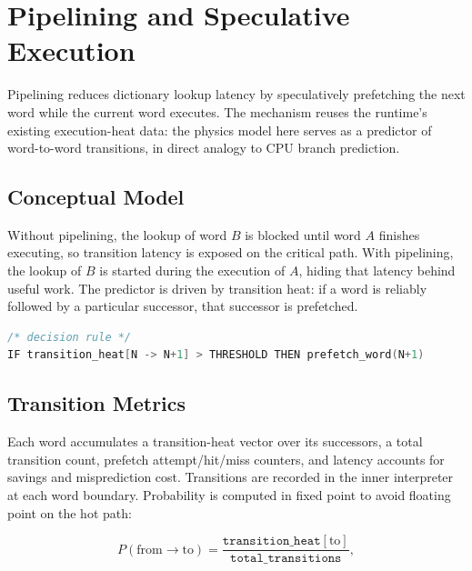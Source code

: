 
\section{Pipelining and Speculative Execution}

Pipelining reduces dictionary lookup latency by speculatively prefetching the
next word while the current word executes. The mechanism reuses the runtime's
existing execution-heat data: the physics model here serves as a predictor of
word-to-word transitions, in direct analogy to CPU branch prediction.

\subsection{Conceptual Model}

Without pipelining, the lookup of word $B$ is blocked until word $A$ finishes
executing, so transition latency is exposed on the critical path. With
pipelining, the lookup of $B$ is started during the execution of $A$, hiding
that latency behind useful work. The predictor is driven by transition heat:
if a word is reliably followed by a particular successor, that successor is
prefetched.

\begin{lstlisting}[language=C]
/* decision rule */
IF transition_heat[N -> N+1] > THRESHOLD THEN prefetch_word(N+1)
\end{lstlisting}

\subsection{Transition Metrics}

Each word accumulates a transition-heat vector over its successors, a total
transition count, prefetch attempt/hit/miss counters, and \Qtype{} latency
accounts for savings and misprediction cost. Transitions are recorded in the
inner interpreter at each word boundary. Probability is computed in \Qtype{}
fixed point to avoid floating point on the hot path:

\begin{equation}
  P(\text{from} \rightarrow \text{to})
  = \frac{\mathtt{transition\_heat}[\text{to}]}{\mathtt{total\_transitions}},
\end{equation}

